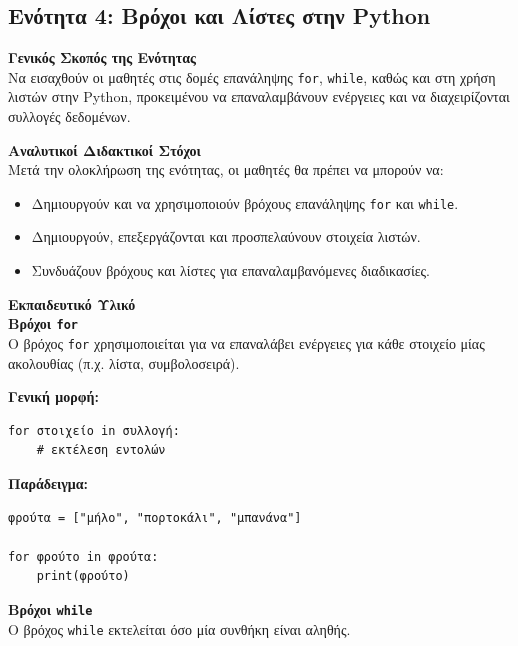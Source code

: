 \documentclass[11pt]{report}
\begin{document}
\subsection{Ενότητα 4: Βρόχοι και Λίστες στην Python}

\textbf{Γενικός Σκοπός της Ενότητας} \\[0.5em]
Να εισαχθούν οι μαθητές στις δομές επανάληψης \texttt{for}, \texttt{while}, καθώς και στη χρήση λιστών στην Python, προκειμένου να επαναλαμβάνουν ενέργειες και να διαχειρίζονται συλλογές δεδομένων.

\vspace{1em}
\textbf{Αναλυτικοί Διδακτικοί Στόχοι}\\
Μετά την ολοκλήρωση της ενότητας, οι μαθητές θα πρέπει να μπορούν να:
\begin{itemize}
    \item Δημιουργούν και να χρησιμοποιούν βρόχους επανάληψης \texttt{for} και \texttt{while}.
    \item Δημιουργούν, επεξεργάζονται και προσπελαύνουν στοιχεία λιστών.
    \item Συνδυάζουν βρόχους και λίστες για επαναλαμβανόμενες διαδικασίες.
\end{itemize}

\vspace{1em}
\textbf{Εκπαιδευτικό Υλικό} \\

\textbf{Βρόχοι \texttt{for}} \\
Ο βρόχος \texttt{for} χρησιμοποιείται για να επαναλάβει ενέργειες για κάθε στοιχείο μίας ακολουθίας (π.χ. λίστα, συμβολοσειρά).

\textbf{Γενική μορφή:}
\begin{tcolorbox}[colback=gray!5!white, colframe=black!75!black]
\begin{verbatim}
for στοιχείο in συλλογή:
    # εκτέλεση εντολών
\end{verbatim}
\end{tcolorbox}

\textbf{Παράδειγμα:}
\begin{tcolorbox}[colback=gray!5!white, colframe=black!75!black]
\begin{verbatim}
φρούτα = ["μήλο", "πορτοκάλι", "μπανάνα"]

for φρούτο in φρούτα:
    print(φρούτο)
\end{verbatim}
\end{tcolorbox}

\vspace{1em}
\textbf{Βρόχοι \texttt{while}} \\
Ο βρόχος \texttt{while} εκτελείται όσο μία συνθήκη είναι αληθής.
\end{document}
